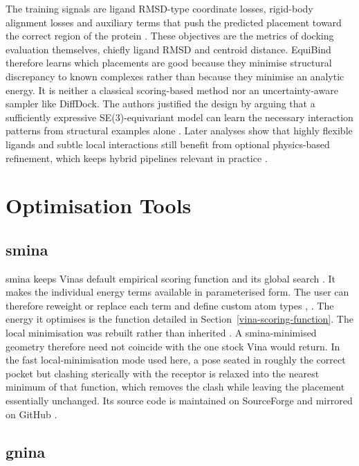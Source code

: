 The training signals are ligand RMSD-type coordinate losses, rigid-body alignment losses and auxiliary terms that push the predicted placement toward the correct region of the protein \cite{ref010}. These objectives are the metrics of docking evaluation themselves, chiefly ligand RMSD and centroid distance. EquiBind therefore learns which placements are good because they minimise structural discrepancy to known complexes rather than because they minimise an analytic energy. It is neither a classical scoring-based method nor an uncertainty-aware sampler like DiffDock. The authors justified the design by arguing that a sufficiently expressive SE(3)-equivariant model can learn the necessary interaction patterns from structural examples alone \cite{ref010}. Later analyses show that highly flexible ligands and subtle local interactions still benefit from optional physics-based refinement, which keeps hybrid pipelines relevant in practice \cite{ref035}.

\hypertarget{optimization-tools-1}{%
\section{Optimisation Tools}\label{optimization-tools-1}}

\hypertarget{smina-1}{%
\subsection{smina}\label{smina-1}}

smina keeps Vina\textquotesingle s default empirical scoring function and its global search \cite{ref055}. It makes the individual energy terms available in parameterised form. The user can therefore reweight or replace each term and define custom atom types \cite{ref055}, \cite{ref057}. The energy it optimises is the function detailed in Section~\ref{vina-scoring-function}. The local minimisation was rebuilt rather than inherited \cite{ref057}. A smina-minimised geometry therefore need not coincide with the one stock Vina would return. In the fast local-minimisation mode used here, a pose seated in roughly the correct pocket but clashing sterically with the receptor is relaxed into the nearest minimum of that function, which removes the clash while leaving the placement essentially unchanged. Its source code is maintained on SourceForge and mirrored on GitHub \cite{ref057}.

\hypertarget{gnina-1}{%
\subsection{gnina}\label{gnina-1}}

